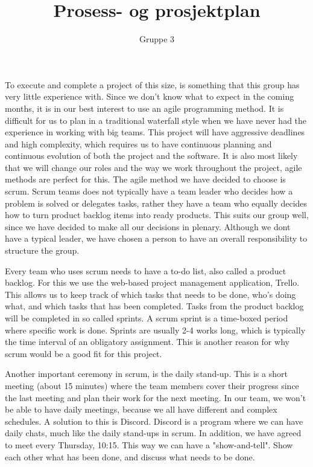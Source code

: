 \documentclass{article}
\begin{document}
\title{Prosess- og prosjektplan}
\author{Gruppe 3}

\maketitle


\raggedright

To execute and complete a project of this size, is something that this group has very little experience with. Since we don't know what to expect in the coming months, it is in our best interest to use an agile programming method. It is difficult for us to plan in a traditional waterfall style when we have never had the experience in working with big teams. This project will have aggressive deadlines and high complexity, which requires us to have continuous planning and continuous evolution of both the project and the software. It is also most likely that we will change our roles and the way we work throughout the project, agile methods are perfect for this. \newline
\newline
The agile method we have decided to choose is scrum. Scrum teams does not typically have a team leader who decides how a problem is solved or delegates tasks, rather they have a team who equally decides how to turn product backlog items into ready products. This suits our group well, since we have decided to make all our decisions in plenary. Although we dont have a typical leader, we have chosen a person to have an overall responsibility to structure the group. \newline

Every team who uses scrum needs to have a to-do list, also called a product backlog. For this we use the web-based project management application, Trello. This allows us to keep track of which tasks that needs to be done, who's doing what, and which tasks that has been completed. Tasks from the product backlog will be completed in so called sprints. A scrum sprint is a time-boxed period where specific work is done. Sprints are usually 2-4 works long, which is typically the time interval of an obligatory assignment. This is another reason for why scrum would be a good fit for this project. \newline

Another important ceremony in scrum, is the daily stand-up. This is a short meeting (about 15 minutes) where the team members cover their progress since the last meeting and plan their work for the next meeting. In our team, we won't be able to have daily meetings, because we all have different and complex schedules. A solution to this is Discord. Discord is a program where we can have daily chats, much like the daily stand-ups in scrum. In addition, we have agreed to meet every Thursday, 10:15. This way we can have a "show-and-tell". Show each other what has been done, and discuss what needs to be done.
\newline
\end{document}
